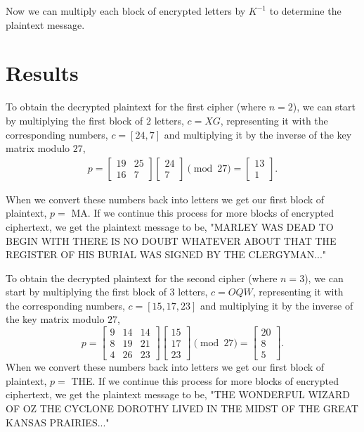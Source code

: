 \documentclass{article}
\begin{document}
Now we can multiply each block of encrypted letters by $K^{-1}$ to determine the plaintext message.


\section{Results}
To obtain the decrypted plaintext for the first cipher (where $n=2$), we can start by multiplying the first block of $2$ letters, $c = XG$, representing it with the corresponding numbers, $c = [24, 7]$ and multiplying it by the inverse of the key matrix modulo $27$,
\begin{align*}
    p = 
    \begin{bmatrix}
        19 & 25\\
        16 & 7
    \end{bmatrix}
    \begin{bmatrix}
        24\\
        7
    \end{bmatrix}
    \pmod{27}
    =
    \begin{bmatrix}
        13\\
        1
    \end{bmatrix}.
\end{align*}

When we convert these numbers back into letters we get our first block of plaintext, $p=$ MA. If we continue this process for more blocks of encrypted ciphertext, we get the plaintext message to be, "MARLEY WAS DEAD TO BEGIN WITH THERE IS NO DOUBT WHATEVER ABOUT THAT THE REGISTER OF HIS BURIAL WAS SIGNED BY THE CLERGYMAN..."
\par To obtain the decrypted plaintext for the second cipher (where $n=3$), we can start by multiplying the first block of $3$ letters, $c = OQW$, representing it with the corresponding numbers, $c = [15, 17, 23]$ and multiplying it by the inverse of the key matrix modulo $27$,
\begin{equation*}
    p = 
    \begin{bmatrix}
        9 & 14 & 14\\
        8 & 19 & 21\\
        4 & 26 & 23
    \end{bmatrix}
    \begin{bmatrix}
        15\\
        17\\
        23
    \end{bmatrix}
    \pmod{27}
    =
    \begin{bmatrix}
        20\\
        8\\
        5
    \end{bmatrix}.
\end{equation*} 
When we convert these numbers back into letters we get our first block of plaintext, $p=$ THE. If we continue this process for more blocks of encrypted ciphertext, we get the plaintext message to be, "THE WONDERFUL WIZARD OF OZ THE CYCLONE DOROTHY LIVED IN THE MIDST OF THE GREAT KANSAS PRAIRIES..."
\end{document}

